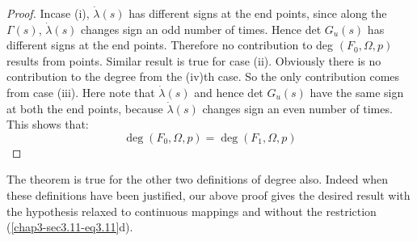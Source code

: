\begin{proof}
In\pageoriginale case (i), $\dot{\lambda} (s)$ has different signs at
the end points, 
since along the $\Gamma(s)$, $\dot{\lambda}(s)$ changes sign an odd number of
times. Hence det $G_u(s)$ has different signs at the end
points. Therefore no contribution to deg $(F_0 , \Omega , p)$ results
from points. Similar result is true for case (ii). Obviously there
is no contribution to the degree from the (iv)th case. So the
only contribution comes from case (iii). Here note that $\dot{\lambda}
(s)$ and hence det $G_u (s)$ have the same sign at both the end
points, because $\dot{\lambda}(s)$ changes sign an even number of
times. This shows that:  
$$
\deg  (F_0 , \Omega , p) = \deg (F_1 , \Omega , p) 
$$
\end{proof}

The theorem is true for the other two definitions of degree
also. Indeed when these definitions have been justified, our above
proof gives the desired result with the hypothesis relaxed to
continuous mappings and without the restriction
(\ref{chap3-sec3.11-eq3.11}d).  


